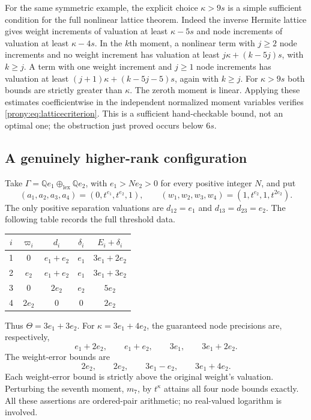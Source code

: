 \documentclass[11pt,letterpaper]{article}
\theoremstyle{definition}
\theoremstyle{remark}
\newcommand{\Q}{\mathbb Q}
\begin{document}
For the same symmetric example, the explicit choice $\kappa>9s$ is a
simple sufficient condition for the full nonlinear lattice theorem.
Indeed the inverse Hermite lattice gives weight increments of valuation
at least $\kappa-5s$ and node increments of valuation at least
$\kappa-4s$. In the $k$th moment, a nonlinear term with $j\ge2$ node
increments and no weight increment has valuation at least
$j\kappa+(k-5j)s$, with $k\ge j$. A term with one weight increment and
$j\ge1$ node increments has valuation at least
$(j+1)\kappa+(k-5j-5)s$, again with $k\ge j$.
For $\kappa>9s$ both bounds are strictly greater than $\kappa$.
The zeroth moment is linear. Applying these estimates coefficientwise in
the independent normalized moment variables verifies
\eqref{prony:eq:latticecriterion}. This is a sufficient hand-checkable bound,
not an optimal one; the obstruction just proved occurs below $6s$.

\subsection{A genuinely higher-rank configuration}
Take $\Gamma=\Q e_1\oplus_{\mathrm{lex}}\Q e_2$, with
$e_1>Ne_2>0$ for every positive integer $N$, and put
\[
 (a_1,a_2,a_3,a_4)=(0,t^{e_1},t^{e_2},1),\qquad
 (w_1,w_2,w_3,w_4)=(1,t^{e_2},1,t^{2e_2}).
\]
The only positive separation valuations are
$d_{12}=e_1$ and $d_{13}=d_{23}=e_2$.
The following table records the full threshold data.
\begin{center}
\begin{tabular}{c c c c c}
\toprule
$i$ & $\varpi_i$ & $d_i$ & $\delta_i$ & $E_i+\delta_i$\\
\midrule
1 & $0$ & $e_1+e_2$ & $e_1$ & $3e_1+2e_2$\\
2 & $e_2$ & $e_1+e_2$ & $e_1$ & $3e_1+3e_2$\\
3 & $0$ & $2e_2$ & $e_2$ & $5e_2$\\
4 & $2e_2$ & $0$ & $0$ & $2e_2$\\
\bottomrule
\end{tabular}
\end{center}
Thus $\Theta=3e_1+3e_2$. For $\kappa=3e_1+4e_2$, the guaranteed node
precisions are, respectively,
\[
 e_1+2e_2,\qquad e_1+e_2,\qquad 3e_1,\qquad 3e_1+2e_2.
\]
The weight-error bounds are
\[
 2e_2,\qquad 2e_2,\qquad 3e_1-e_2,\qquad 3e_1+4e_2.
\]
Each weight-error bound is strictly above the original weight's valuation.
Perturbing the seventh moment, $m_7$, by $t^\kappa$ attains all four node
bounds exactly. All these assertions are ordered-pair arithmetic; no
real-valued logarithm is involved.
\end{document}
